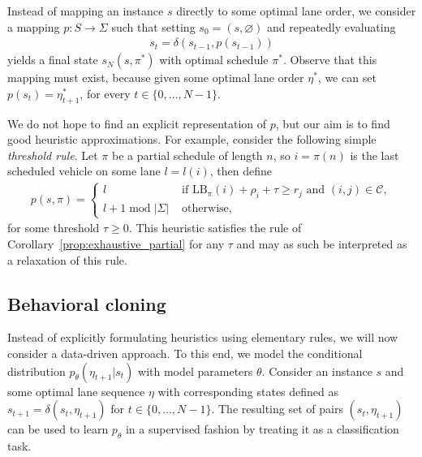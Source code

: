 \documentclass[a4paper]{article}
\theoremstyle{definition}
\theoremstyle{plain}
\begin{document}
Instead of mapping an instance $s$ directly to some optimal lane order, we
consider a mapping $p : S \rightarrow \Sigma$ such that setting
$s_{0} = (s, \varnothing)$ and repeatedly evaluating
\begin{align*}
  s_{t} = \delta(s_{t-1}, p(s_{t-1}))
\end{align*}
yields a final state $s_{N}(s, \pi^{*})$ with optimal schedule $\pi^{*}$.
Observe that this mapping must exist, because given some optimal lane order
$\eta^{*}$, we can set $p(s_{t}) = \eta^{*}_{t+1}$, for every $t \in \{0, \dots, N-1\}$.

We do not hope to find an explicit representation of $p$, but our aim is to find
good heuristic approximations.
For example, consider the following simple \textit{threshold rule}.
%
Let $\pi$ be a partial schedule of length $n$, so $i=\pi(n)$ is the last
scheduled vehicle on some lane $l=l(i)$, then define
\begin{align*}
  p(s, \pi) = \begin{cases}
                l \quad &\text{ if } \text{LB}_{\pi}(i) + \rho_{i} + \tau \geq r_{j} \text{ and } (i,j) \in \mathcal{C} , \\
                l+1 \; \mathrm{mod} \; |\Sigma| & \text{ otherwise, }
              \end{cases}
\end{align*}
for some threshold $\tau \geq 0$. This heuristic satisfies the rule of
Corollary~\ref{prop:exhaustive_partial} for any $\tau$ and may as such be
interpreted as a relaxation of this rule.


\subsection*{Behavioral cloning}


Instead of explicitly formulating heuristics using elementary rules, we will now
consider a data-driven approach. To this end, we model the conditional
distribution $p_{\theta}(\eta_{t+1} | s_{t})$ with model parameters $\theta$.
%
Consider an instance $s$ and some optimal lane sequence $\eta$ with
corresponding states defined as $s_{t+1} = \delta(s_{t}, \eta_{t+1})$ for
$t \in \{0, \dots, N-1\}$. The resulting set of pairs $(s_{t}, \eta_{t+1})$ can be
used to learn $p_{\theta}$ in a supervised fashion by treating it as a classification
task.
\end{document}
